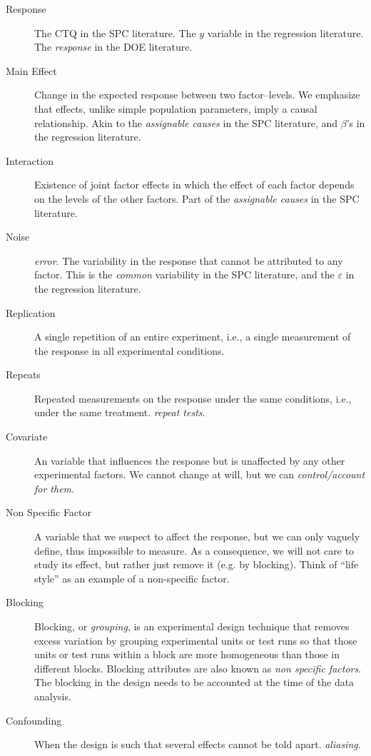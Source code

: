 \begin{tcolorbox}[breakable]
\begin{description}
\item [Response] 
The CTQ in the SPC literature. 
The $y$ variable in the regression literature. 
The \emph{response} in the DOE literature. 

\item [Main Effect] Change in the expected response between two factor–levels.  
We emphasize that effects, unlike simple population parameters, imply a causal relationship.
Akin to the \emph{assignable causes} in the SPC literature, and $\beta$'s in the regression literature. 

\item [Interaction] Existence of joint factor effects in which the effect of each factor depends on the levels of the other factors.
Part of the \emph{assignable causes} in the SPC literature.

\item [Noise] \Aka \emph{error}. 
The variability in the response that cannot be attributed to any factor.
This is the \emph{common} variability in the SPC literature, and the $\varepsilon$ in the regression literature. 

\item [Replication] A single repetition of an entire experiment, i.e., a single measurement of the response in all experimental conditions.

\item [Repeats] Repeated measurements on the response under the same conditions, i.e., under the same treatment. \Aka \emph{repeat tests}.

\item [Covariate]  An variable that influences the response but is unaffected by any other experimental factors.
We cannot change at will, but we can \emph{control/account for them}. 

\item [Non Specific Factor] A variable that we suspect to affect the response, but we can only vaguely define, thus impossible to measure. 
As a consequence, we will not care to study its effect, but rather just remove it (e.g. by blocking). 
Think of ``life style'' as an example of a non-specific factor.

\item [Blocking]  Blocking, or \emph{grouping}, is an experimental design technique that removes excess variation by grouping experimental units or test runs so that those units or test runs within a block are more homogeneous than those in different blocks. Blocking attributes are also known as \emph{non specific factors}.
The blocking in the design needs to be accounted at the time of the data analysis.

\item [Confounding] When the design is such that several effects cannot be told apart. \Aka \emph{aliasing}.

\end{description}

\end{tcolorbox}



